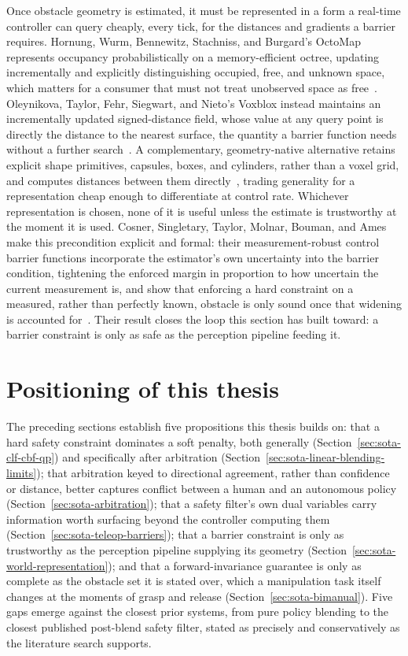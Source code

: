 \documentclass[12pt,a4paper,twoside,openright]{report}
\begin{document}
Once obstacle geometry is estimated, it must be represented in a form a real-time controller can query cheaply, every tick, for the distances and gradients a barrier requires. Hornung, Wurm, Bennewitz, Stachniss, and Burgard's OctoMap represents occupancy probabilistically on a memory-efficient octree, updating incrementally and explicitly distinguishing occupied, free, and unknown space, which matters for a consumer that must not treat unobserved space as free~\cite{hornung2013octomap}. Oleynikova, Taylor, Fehr, Siegwart, and Nieto's Voxblox instead maintains an incrementally updated signed-distance field, whose value at any query point is directly the distance to the nearest surface, the quantity a barrier function needs without a further search~\cite{oleynikova2017voxblox}. A complementary, geometry-native alternative retains explicit shape primitives, capsules, boxes, and cylinders, rather than a voxel grid, and computes distances between them directly~\cite{montaut2023diffcol}, trading generality for a representation cheap enough to differentiate at control rate. Whichever representation is chosen, none of it is useful unless the estimate is trustworthy at the moment it is used. Cosner, Singletary, Taylor, Molnar, Bouman, and Ames make this precondition explicit and formal: their measurement-robust control barrier functions incorporate the estimator's own uncertainty into the barrier condition, tightening the enforced margin in proportion to how uncertain the current measurement is, and show that enforcing a hard constraint on a measured, rather than perfectly known, obstacle is only sound once that widening is accounted for~\cite{cosner2021mrcbf}. Their result closes the loop this section has built toward: a barrier constraint is only as safe as the perception pipeline feeding it.

\section{Positioning of this thesis}
\label{sec:sota-positioning}

The preceding sections establish five propositions this thesis builds on: that a hard safety constraint dominates a soft penalty, both generally (Section~\ref{sec:sota-clf-cbf-qp}) and specifically after arbitration (Section~\ref{sec:sota-linear-blending-limits}); that arbitration keyed to directional agreement, rather than confidence or distance, better captures conflict between a human and an autonomous policy (Section~\ref{sec:sota-arbitration}); that a safety filter's own dual variables carry information worth surfacing beyond the controller computing them (Section~\ref{sec:sota-teleop-barriers}); that a barrier constraint is only as trustworthy as the perception pipeline supplying its geometry (Section~\ref{sec:sota-world-representation}); and that a forward-invariance guarantee is only as complete as the obstacle set it is stated over, which a manipulation task itself changes at the moments of grasp and release (Section~\ref{sec:sota-bimanual}). Five gaps emerge against the closest prior systems, from pure policy blending to the closest published post-blend safety filter, stated as precisely and conservatively as the literature search supports.
\end{document}
